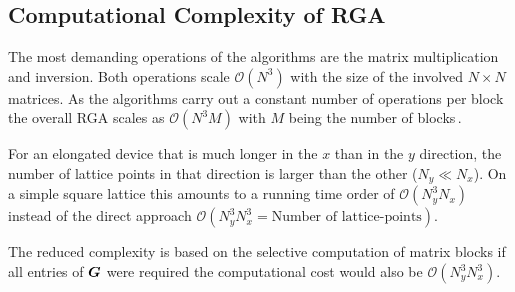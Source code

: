 \subsection{Computational Complexity of RGA}\label{sec:rgacomplexity}
The most demanding operations of the algorithms are the matrix multiplication and inversion. Both operations scale $\mathcal{O}(N^3)$ with the size of the involved $N \times N$ matrices. As the algorithms carry out a constant number of operations per block the overall RGA scales as $\mathcal{O}(N^3M)$ with $M$ being the number of blocks\,\cite{Li2009Thesis}.\par
For an elongated device that is much longer in the $x$ than in the $y$ direction, the number of lattice points in that direction is larger than the other ($N_y \ll N_x$). On a simple square lattice this amounts to a running time order of $\mathcal{O}(N_y^3N_x)$  instead of the direct approach $\mathcal{O}(N_y^3N_x^3=\text{Number of lattice-points})$.\par
The reduced complexity is based on the selective computation of matrix blocks if all entries of $\boldsymbol{G}$ were required the computational cost would also be $\mathcal{O}(N_y^3N_x^3)$.
\FloatBarrier
